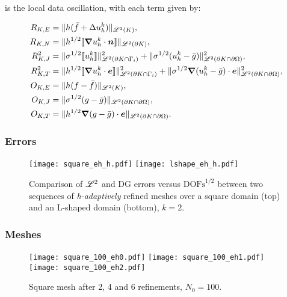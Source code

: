 is the local data oscillation, with each term given by:

\begin{align}
	R_{K, E} &= \lVert h (\bar{f} + \Delta u^k_h) \rVert_{\mathscr{L}^2(K)}, \\
	R_{K, N} &= \lVert h^{1/2} \llbracket \bm{\nabla} u^k_h \cdot \bm{n} \rrbracket \rVert_{\mathscr{L}^2(\partial K)}, \\
	R^2_{K, J} &= \lVert \sigma^{1/2} \llbracket u^k_h \rrbracket \rVert^2_{\mathscr{L}^2(\partial K \cap \Gamma_{i})} + \lVert \sigma^{1/2} (u^k_h - \bar{g}) \rVert^2_{\mathscr{L}^2(\partial K \cap \partial \Omega)}, \\
	R^2_{K, T} &= \lVert h^{1/2} \llbracket \bm{\nabla} u^k_h \cdot \bm{e} \rrbracket \rVert^2_{\mathscr{L}^2(\partial K \cap \Gamma_{i})} + \lVert \sigma^{1/2} \bm{\nabla} (u^k_h - \bar{g}) \cdot \bm{e} \rVert^2_{\mathscr{L}^2(\partial K \cap \partial \Omega)}, \\
	O_{K, E} &= \lVert h (f - \bar{f}) \rVert_{\mathscr{L}^2(K)}, \\
	O_{K, J} &= \lVert \sigma^{1/2} (g - \bar{g}) \rVert_{\mathscr{L}^2(\partial K \cap \partial \Omega)}, \\
	O_{K, T} &= \lVert h^{1/2} \bm{\nabla} (g - \bar{g}) \cdot \bm{e} \rVert_{\mathscr{L}^2(\partial K \cap \partial \Omega)}.
\end{align}

\newpage
\subsubsection{Errors}

\begin{figure}[!ht]
	\centering
	\texttt{[image: square\_eh\_h.pdf]}
    \texttt{[image: lshape\_eh\_h.pdf]}
	\caption{Comparison of $\mathscr{L}^2$ and DG errors versus $\text{DOFs}^{1/2}$ between two sequences of \textit{h-adaptively} refined meshes over a square domain (top) and an L-shaped domain (bottom), $k = 2$.}
\end{figure}

\newpage
\subsubsection{Meshes}

\begin{figure}[!ht]
	\centering
	\texttt{[image: square\_100\_eh0.pdf]}
    \texttt{[image: square\_100\_eh1.pdf]}
    \texttt{[image: square\_100\_eh2.pdf]}
	\caption{Square mesh after 2, 4 and 6 refinements, $N_0 = 100$.}
\end{figure}

